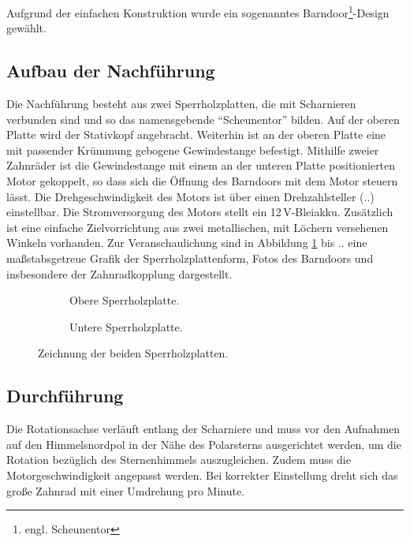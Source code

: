 Aufgrund der einfachen Konstruktion wurde ein sogenanntes
Barndoor\footnote{engl. Scheunentor}-Design gewählt.

\subsection{Aufbau der Nachführung}

Die Nachführung besteht aus zwei Sperrholzplatten, die mit Scharnieren verbunden
sind und so das namensgebende \enquote{Scheunentor} bilden. Auf der oberen
Platte wird der Stativkopf angebracht. Weiterhin ist an der oberen Platte eine
mit passender Krümmung gebogene Gewindestange befestigt. Mithilfe zweier
Zahnräder ist die Gewindestange mit einem an der unteren Platte positionierten
Motor gekoppelt, so dass sich die Öffnung des Barndoors mit dem Motor steuern
lässt. Die Drehgeschwindigkeit des Motors ist über einen Drehzahlsteller (..)
einstellbar. Die Stromversorgung des Motors stellt ein 12\,V-Bleiakku.
Zusätzlich ist eine einfache Zielvorrichtung aus zwei metallischen, mit Löchern
versehenen Winkeln vorhanden. Zur Veranschaulichung sind in Abbildung
\ref{Schema} bis .. eine maßstabsgetreue Grafik der Sperrholzplattenform, Fotos
des Barndoors und insbesondere der Zahnradkopplung dargestellt.


\begin{figure}\centering%
\begin{subfigure}{0.75\columnwidth}
\caption{Obere Sperrholzplatte.}
\end{subfigure}

\begin{subfigure}{0.75\columnwidth}
\caption{Untere Sperrholzplatte.}
\end{subfigure}
\caption{Zeichnung der beiden Sperrholzplatten.}%
\label{Schema}
\end{figure}

\subsection{Durchführung}

Die Rotationsachse verläuft entlang der Scharniere und muss vor den Aufnahmen
auf den Himmelsnordpol in der Nähe des Polarsterns ausgerichtet werden, um die
Rotation bezüglich des Sternenhimmels auszugleichen. Zudem muss die
Motorgeschwindigkeit angepasst werden. Bei korrekter Einstellung dreht sich das
große Zahnrad mit einer Umdrehung pro Minute.


